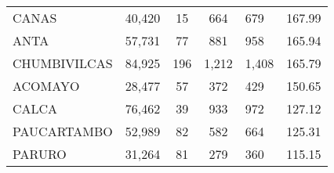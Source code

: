 \begin{tabular}{lrcclr}
	\cellcolor[HTML]{FFFF99}CANAS                                  & 40,420                                                         & 15                                                         & 664                  & 679                                                                 & 167.99                                                                       \\
	\cellcolor[HTML]{FFFF99}ANTA                                   & 57,731                                                         & 77                                                         & 881                  & 958                                                                 & 165.94                                                                       \\
	\cellcolor[HTML]{C6E0B4}CHUMBIVILCAS                           & 84,925                                                         & 196                                                        & 1,212                & 1,408                                                               & 165.79                                                                       \\
	\cellcolor[HTML]{C6E0B4}ACOMAYO                                & 28,477                                                         & 57                                                         & 372                  & 429                                                                 & 150.65                                                                       \\
	\cellcolor[HTML]{C6E0B4}CALCA                                  & 76,462                                                         & 39                                                         & 933                  & 972                                                                 & 127.12                                                                       \\
	\cellcolor[HTML]{C6E0B4}PAUCARTAMBO                            & 52,989                                                         & 82                                                         & 582                  & 664                                                                 & 125.31                                                                       \\
	\cellcolor[HTML]{C6E0B4}PARURO                                 & 31,264                                                         & 81                                                         & 279                  & 360                                                                 & 115.15                                                                       \\

\end{tabular}
